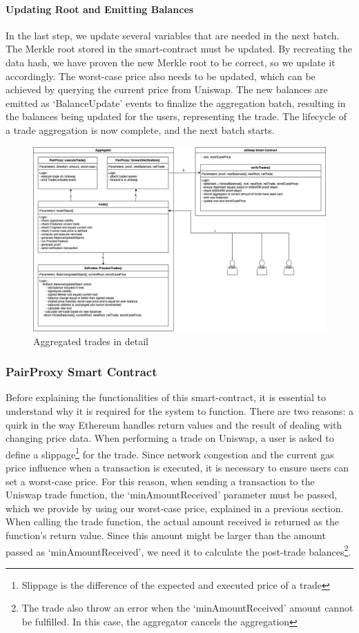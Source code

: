 \documentclass[../../thesis.tex]{subfiles}
\begin{document}
\paragraph{Updating Root and Emitting Balances}
In the last step, we update several variables that are needed in the next batch. The Merkle root stored in the smart-contract must be updated. By recreating the data hash, we have proven the new Merkle root to be correct, so we update it accordingly. The worst-case price also needs to be updated, which can be achieved by querying the current price from Uniswap. The new balances are emitted as `BalanceUpdate' events to finalize the aggregation batch, resulting in the balances being updated for the users, representing the trade. The lifecycle of a trade aggregation is now complete, and the next batch starts.

\begin{figure}[h]
    \centerline{\includegraphics[totalheight=8cm]{diagrams/tradeAggregated.png}}
    \caption{Aggregated trades in detail}
    \label{fig:trade_aggr}
\end{figure}

\subsubsection{PairProxy Smart Contract} \label{pairProxy}
Before explaining the functionalities of this smart-contract, it is essential to understand why it is required for the system to function. There are two reasons: a quirk in the way Ethereum handles return values and the result of dealing with changing price data.
When performing a trade on Uniswap, a user is asked to define a slippage\footnote{Slippage is the difference of the expected and executed price of a trade} for the trade. Since network congestion and the current gas price influence when a transaction is executed, it is necessary to ensure users can set a worst-case price. For this reason, when sending a transaction to the Uniswap trade function, the `minAmountReceived' parameter must be passed, which we provide by using our worst-case price, explained in a previous section. When calling the trade function, the actual amount received is returned as the function's return value. Since this amount might be larger than the amount passed as `minAmountReceived', we need it to calculate the post-trade balances\footnote{The trade also throw an error when the `minAmountReceived' amount cannot be fulfilled. In this case, the aggregator cancels the aggregation}. 
\end{document}
